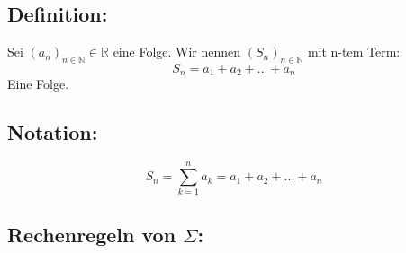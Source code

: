 \subsection{Definition:}
Sei $(a_n)_{n∈ℕ}∈ℝ$ eine Folge. Wir nennen $(S_n)_{n∈ℕ}$ mit n-tem Term: $$S_n = a_1 +a_2 + ... + a_n$$ Eine Folge.
\subsection{Notation:}
$$S_n=\sum_{k=1}^n a_k=a_1 +a_2 + ... + a_n$$
\subsection{Rechenregeln von $\Sigma$:}
